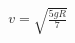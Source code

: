 \documentclass[preview]{standalone}
\begin{document}
\begin{align*}
v = \sqrt{\frac{5gR}{7}}
\end{align*}
\end{document}

